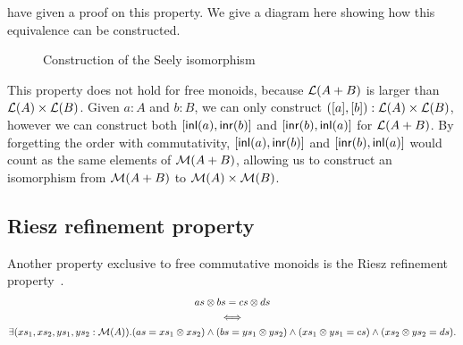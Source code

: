 \cite{choudhuryFreeCommutativeMonoids2023} have given a proof on this property. We give a diagram here
showing how this equivalence can be constructed.

\begin{figure}[H]
    \centering
    \caption{Construction of the Seely isomorphism}
    \label{fig:enter-label}
\end{figure}

This property does not hold for free monoids, because $\mathcal{L}(A + B)$ is larger than $\mathcal{L}(A) \times \mathcal{L}(B)$.
Given $a: A$ and $b: B$, we can only construct $([a], [b]) : \mathcal{L}(A) \times \mathcal{L}(B)$, however we can
construct both $[\operatorname{\mathsf{inl}}(a), \operatorname{\mathsf{inr}}(b)]$ and $[\operatorname{\mathsf{inr}}(b), \operatorname{\mathsf{inl}}(a)]$ for $\mathcal{L}(A + B)$.
By forgetting the order with commutativity,
$[\operatorname{\mathsf{inl}}(a), \operatorname{\mathsf{inr}}(b)]$ and $[\operatorname{\mathsf{inr}}(b), \operatorname{\mathsf{inl}}(a)]$ would count as the same elements
of $\mathcal{M}(A + B)$, allowing us to construct an isomorphism from $\mathcal{M}(A + B)$ to $\mathcal{M}(A) \times \mathcal{M}(B)$.

\subsection{Riesz refinement property}
Another property exclusive to free commutative monoids is the Riesz refinement
property~\cite{dobbertinRefinementMonoidsVaught1983}.
\begin{equation*}
\begin{gathered}
    as \otimes bs = cs \otimes ds \\
    \iff \\
    \exists (xs_{1}, xs_{2}, ys_{1}, ys_{2} : \mathcal{M}(A)).
    (as = xs_{1} \otimes xs_{2}) \land (bs = ys_{1} \otimes ys_{2}) \land
    (xs_{1} \otimes ys_{1} = cs) \land (xs_{2} \otimes ys_{2} = ds).
\end{gathered}
\end{equation*}

